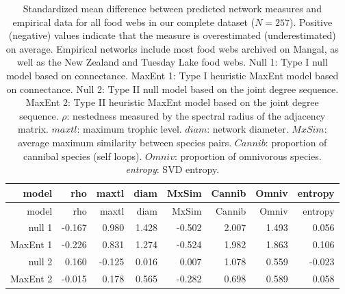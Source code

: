 \documentclass[11pt]{article}
\begin{document}
\hypertarget{tbl:measures_all}{}
\begin{longtable}[]{@{}rrrrrrrr@{}}
\caption{\label{tbl:measures_all}Standardized mean difference between
predicted network measures and empirical data for all food webs in our
complete dataset (\(N = 257\)). Positive (negative) values indicate that
the measure is overestimated (underestimated) on average. Empirical
networks include most food webs archived on Mangal, as well as the New
Zealand and Tuesday Lake food webs. Null 1: Type I null model based on
connectance. MaxEnt 1: Type I heuristic MaxEnt model based on
connectance. Null 2: Type II null model based on the joint degree
sequence. MaxEnt 2: Type II heuristic MaxEnt model based on the joint
degree sequence. \(\rho\): nestedness measured by the spectral radius of
the adjacency matrix. \(maxtl\): maximum trophic level. \(diam\):
network diameter. \(MxSim\): average maximum similarity between species
pairs. \(Cannib\): proportion of cannibal species (self loops).
\(Omniv\): proportion of omnivorous species. \emph{entropy}: SVD
entropy.}\tabularnewline
\toprule
model & rho & maxtl & diam & MxSim & Cannib & Omniv &
entropy\tabularnewline
\midrule
\endfirsthead
\toprule
model & rho & maxtl & diam & MxSim & Cannib & Omniv &
entropy\tabularnewline
\midrule
\endhead
null 1 & -0.167 & 0.980 & 1.428 & -0.502 & 2.007 & 1.493 &
0.056\tabularnewline
MaxEnt 1 & -0.226 & 0.831 & 1.274 & -0.524 & 1.982 & 1.863 &
0.106\tabularnewline
null 2 & 0.160 & -0.125 & 0.016 & 0.007 & 1.078 & 0.559 &
-0.023\tabularnewline
MaxEnt 2 & -0.015 & 0.178 & 0.565 & -0.282 & 0.698 & 0.589 &
0.058\tabularnewline
\bottomrule
\end{longtable}
\end{document}

